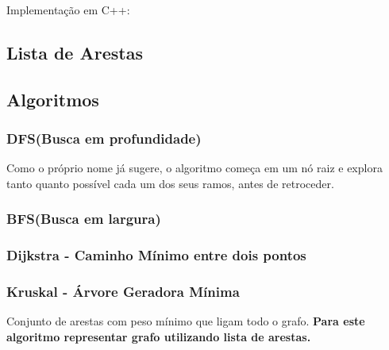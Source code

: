 \documentclass[a4paper,12pt]{article}
\begin{document}
\noindent Implementação em C++:


\subsection{Lista de Arestas}

\subsection{Algoritmos}
\subsubsection{DFS(Busca em profundidade)}

Como o próprio nome já sugere, o algoritmo começa em um nó raiz e explora tanto quanto possível cada um dos seus ramos, antes de retroceder.


\subsubsection{BFS(Busca em largura)}


\subsubsection{Dijkstra - Caminho Mínimo entre dois pontos}


\subsubsection{Kruskal - Árvore Geradora Mínima}

Conjunto de arestas com peso mínimo que ligam todo o grafo. \textbf{Para este algoritmo representar grafo utilizando lista de arestas.}

\end{document}
